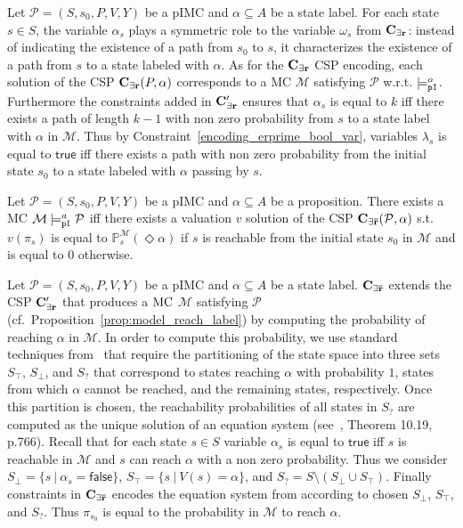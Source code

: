 \documentclass{llncs}
\newcommand{\mc}{\textnormal{MC}}
\newcommand{\pimc}{\textnormal{pIMC}}
\newcommand{\csp}{\textnormal{CSP}}
\newcommand{\satisfactionPimc}{\ensuremath{\models^a_{\tt{pI}}}}
\newcommand{\satisfactionPimcOnce}{\ensuremath{\models^o_{\tt{pI}}}}
\newcommand{\Mer}{\ensuremath{{\bf C_{{\exists}r}}}}
\newcommand{\MerPrime}{\ensuremath{{\bf C^{\prime}_{{\exists}r}}}}
\newcommand{\MerExt}{\ensuremath{{\bf C_{{\exists}\bar{r}}}}}
\newcommand{\cf} {cf.\ }
\newcommand{\Proba}            {\ensuremath{\mathbb{P}}}
\newcommand{\true}             {\ensuremath{\mathsf{true}}}
\newcommand{\false}            {\ensuremath{\mathsf{false}}}
\newcommand{\ltlExists}{\ensuremath{\Diamond}}
\begin{document}
Let  $\mathcal{P} = (S, s_0 , P, V, Y)$ be a {\pimc} and
$\alpha \subseteq A$ be a state label.
For each state $s \in S$, the variable $\alpha_s$ plays a symmetric role to 
the variable $\omega_s$ from $\Mer$: instead of indicating the existence
of a path from $s_0$ to $s$, it characterizes the existence of a path
from $s$ to a state labeled with $\alpha$. 
As for the $\Mer$ {\csp} encoding, each solution of the {\csp} $\Mer(P, \alpha)$
corresponds to a {\mc} $\mathcal{M}$ satisfying $\mathcal{P}$ w.r.t. $\satisfactionPimcOnce$.
Furthermore the constraints added in $\MerPrime$ ensures that $\alpha_s$ is equal to $k$
iff there exists a path of length $k-1$ with non zero probability from $s$ to a state label with $\alpha$ in $\mathcal{M}$.
Thus by Constraint~\ref{encoding_erprime_bool_var}, 
variables $\lambda_s$ is equal to {\true} iff
there exists a path with non zero probability from the initial state
$s_0$ to a state labeled with $\alpha$ passing by $s$.


 \begin{proposition}\label{prop:model_quant_reachability}
 	Let  $\mathcal{P} = (S, s_0 , P, V, Y)$ be a {\pimc} and
 	$\alpha \subseteq A$ be a proposition.
 	There exists a {\mc} $\mathcal{M} \satisfactionPimc \mathcal{P}$
 	iff
 	there exists a valuation $v$ solution of the {\csp} $\MerExt(\mathcal{P},\alpha)$ s.t.
 	$v(\pi_{s})$ is equal to $\Proba^\mathcal{M}_s(\ltlExists \alpha)$ if $s$ is reachable from the initial state $s_0$ in $\mathcal{M}$
 	and is equal to $0$ otherwise.
 \end{proposition}

Let  $\mathcal{P} = (S, s_0 , P, V, Y)$ be a {\pimc} and
$\alpha \subseteq A$ be a state label.
$\MerExt$ extends the {\csp} $\MerPrime$ that produces a 
$\mc$ $\mathcal{M}$ satisfying $\mathcal{P}$ (\cf Proposition~\ref{prop:model_reach_label})
by computing the probability of reaching $\alpha$ in $\mathcal{M}$.
In order to compute this probability, we
use standard techniques from~\cite{Baier2008PMC} that require the
partitioning of the state space into three sets $S_{\top}$,
$S_{\bot}$, and $S_?$ that correspond to states reaching
$\alpha$ with probability $1$, states from which $\alpha$ cannot be
reached, and the remaining states, respectively. Once this partition is chosen, the
reachability probabilities of all states in $S_?$ are computed as the
unique solution of an equation system (see~\cite{Baier2008PMC},
Theorem 10.19, p.766). 
Recall that for each state $s \in S$
variable $\alpha_s$ is equal to {\true} iff $s$ is reachable in $\mathcal{M}$ and $s$ can reach $\alpha$ with a non zero probability.
Thus we consider $S_\bot = \{s \ |\ \alpha_s = \false\}$,
$S_\top = \{s \ |\ V(s) = \alpha\}$, and
$S_? = S \setminus (S_\bot \cup S_\top)$.
Finally constraints in $\MerExt$ encodes the equation system from \cite{Baier2008PMC}
according to chosen $S_\bot$, $S_\top$, and $S_?$.
Thus $\pi_{s_0}$ is equal to the probability in $\mathcal{M}$
to reach $\alpha$.
\end{document}
